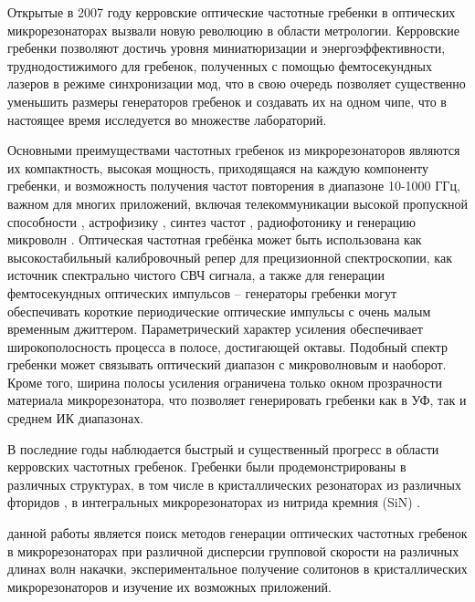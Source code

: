 
{\actuality} Открытые в  2007 году керровские оптические частотные гребенки в оптических микрорезонаторах \cite{DelHaye2007,Kippenberg2011} вызвали новую революцию в области метрологии. Керровские гребенки позволяют достичь уровня миниатюризации и энергоэффективности, труднодостижимого для гребенок, полученных с помощью фемтосекундных лазеров в режиме синхронизации мод, что в свою очередь позволяет существенно уменьшить размеры генераторов гребенок и создавать их на одном чипе, что в настоящее время исследуется во множестве лабораторий.

Основными преимуществами частотных гребенок из микрорезонаторов являются их компактность, высокая мощность, приходящаяся на каждую компоненту гребенки, и возможность получения частот повторения в диапазоне 10-1000 ГГц, важном для многих приложений, включая телекоммуникации высокой пропускной способности \cite{Pfeifle2014}, астрофизику \cite{Glenday2015}, синтез частот \cite{Ferdous2011}, радиофотонику и генерацию микроволн \cite{Xue2016,Savchenkov2008}. Оптическая частотная гребёнка может быть использована как высокостабильный калибровочный репер для прецизионной спектроскопии, как источник спектрально чистого СВЧ сигнала, а также для генерации фемтосекундных оптических импульсов – генераторы гребенки могут обеспечивать короткие периодические оптические импульсы с очень малым временным джиттером. Параметрический характер усиления обеспечивает широкополосность процесса в полосе, достигающей октавы. Подобный спектр гребенки может связывать оптический диапазон с микроволновым и наоборот. Кроме того, ширина полосы усиления ограничена только окном прозрачности материала микрорезонатора, что позволяет генерировать гребенки как в УФ, так и среднем ИК диапазонах.

В последние годы наблюдается быстрый и существенный прогресс в области керровских частотных гребенок. Гребенки были продемонстрированы в различных структурах, в том числе в кристаллических резонаторах из различных фторидов \cite{Savchenkov2008,Grudinin2012,Jost2015,Liang2011,DelHaye2011,Chembo2010,Grudinin2009}, в интегральных микрорезонаторах из нитрида кремния (SiN) \cite{Levy2010,Okawachi2011,Johnson2012,Huang2015}.


{\aim} данной работы является поиск методов генерации оптических частотных гребенок в микрорезонаторах при различной дисперсии групповой скорости на различных длинах волн накачки, экспериментальное получение солитонов в кристаллических микрорезонаторов и изучение их возможных приложений.

